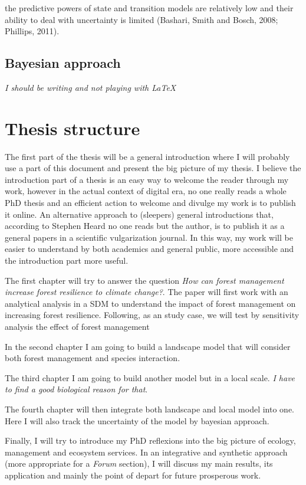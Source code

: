 the predictive powers of state and transition models are relatively low and their ability to deal with uncertainty is limited (Bashari, Smith and Bosch, 2008; Phillips, 2011).

\subsection{Bayesian approach}

\textit{I should be writing and not playing with \LaTeX}

\section{Thesis structure}

The first part of the thesis will be a general introduction where I will probably use a part of this document and present the big picture of my thesis.
I believe the introduction part of a thesis is an easy way to welcome the reader through my work, however in the actual context of digital era, no one really reads a whole PhD thesis and an efficient action to welcome and divulge my work is to publish it online.
An alternative approach to (sleepers) general introductions that, according to Stephen Heard\footnotemark{} no one reads but the author, is to publish it as a general papers in a scientific vulgarization journal.
In this way, my work will be easier to understand by both academics and general public, more accessible and the introduction part more useful.

The first chapter will try to answer the question \textit{How can forest management increase forest resilience to climate change?}.
The paper will first work with an analytical analysis in a SDM to understand the impact of forest management on increasing forest resilience.
Following, as an study case, we will test by sensitivity analysis the effect of forest management

In the second chapter I am going to build a landscape model that will consider both forest management and species interaction.

The third chapter I am going to build another model but in a local scale. \textit{I have to find a good biological reason for that}.

The fourth chapter will then integrate both landscape and local model into one. Here I will also track the uncertainty of the model by bayesian approach.

Finally, I will try to introduce my PhD reflexions into the big picture of ecology, management and ecosystem services. In an integrative and synthetic approach (more appropriate for a \textit{Forum} section), I will discuss my main results, its application and mainly the point of depart for future prosperous work.


\clearpage
\printbibliography


